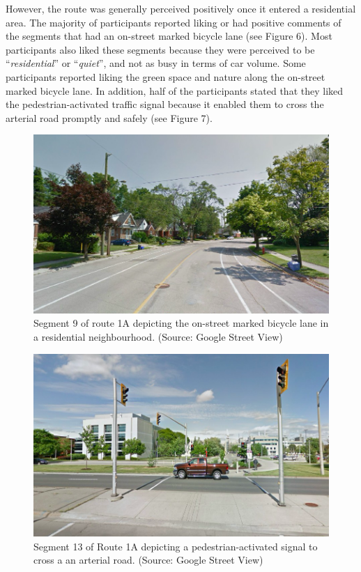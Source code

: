 \documentclass[]{elsarticle} %
\begin{document}
However, the route was generally perceived positively once it entered a
residential area. The majority of participants reported liking or had
positive comments of the segments that had an on-street marked bicycle
lane (see Figure 6). Most participants also liked these segments because
they were perceived to be ``\emph{residential}'' or ``\emph{quiet}'',
and not as busy in terms of car volume. Some participants reported
liking the green space and nature along the on-street marked bicycle
lane. In addition, half of the participants stated that they liked the
pedestrian-activated traffic signal because it enabled them to cross the
arterial road promptly and safely (see Figure 7).

\begin{figure}

{\centering \includegraphics[width=0.65\linewidth]{Figure 6} 

}

\caption{Segment 9 of route 1A depicting the on-street marked bicycle lane in a residential neighbourhood. (Source: Google Street View)}\label{fig:figure-6}
\end{figure}

\begin{figure}

{\centering \includegraphics[width=0.65\linewidth]{Figure 7} 

}

\caption{Segment 13 of Route 1A depicting a pedestrian-activated signal to cross a an arterial road. (Source: Google Street View)}\label{fig:figure-7}
\end{figure}
\end{document}
